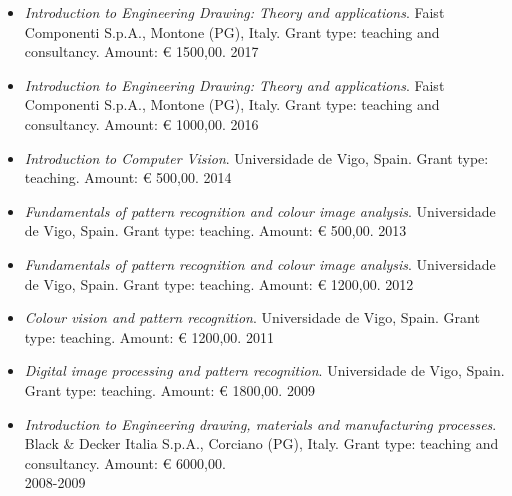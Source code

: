 \documentclass[11pt]{article}
\begin{document}
\begin{itemize}
	\item \emph{Introduction to Engineering Drawing: Theory and applications}. Faist Componenti S.p.A., Montone (PG), Italy. Grant type: teaching and consultancy. Amount: € 1500,00. \hfill 2017
\end{itemize}

\begin{itemize}
	\item \emph{Introduction to Engineering Drawing: Theory and applications}. Faist Componenti S.p.A., Montone (PG), Italy. Grant type: teaching and consultancy. Amount: € 1000,00. \hfill 2016
\end{itemize}

\begin{itemize}
	\item \emph{Introduction to Computer Vision}. Universidade de Vigo, Spain. Grant type: teaching. Amount: € 500,00. \hfill 2014
\end{itemize}

\begin{itemize}
	\item \emph{Fundamentals of pattern recognition and colour image analysis}. Universidade de Vigo, Spain. Grant type: teaching. Amount: € 500,00. \hfill 2013
\end{itemize}

\begin{itemize}
	\item \emph{Fundamentals of pattern recognition and colour image analysis}. Universidade de Vigo, Spain. Grant type: teaching. Amount: € 1200,00. \hfill 2012
\end{itemize}

\begin{itemize}
	\item \emph{Colour vision and pattern recognition}. Universidade de Vigo, Spain. Grant type: teaching. Amount: € 1200,00. \hfill 2011
\end{itemize}

\begin{itemize}
	\item \emph{Digital image processing and pattern recognition}. Universidade de Vigo, Spain. Grant type: teaching. Amount: € 1800,00. \hfill 2009
\end{itemize}

\begin{itemize}
	\item \emph{Introduction to Engineering drawing, materials and manufacturing processes}. Black \& Decker Italia S.p.A., Corciano (PG), Italy. Grant type: teaching and consultancy. Amount: € 6000,00. \\ \mbox{} \hfill 2008-2009
\end{itemize}
\end{document}
